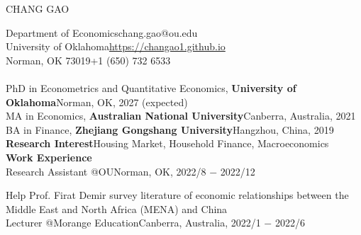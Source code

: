 \documentclass[10pt,letterpaper]{article}
\begin{document}
	\begin{center}
		{\Large CHANG GAO}
	\end{center}
	\noindent Department of Economics\hfill chang.gao@ou.edu\medskip\\
	University of Oklahoma\hfill\href{https://changao1.github.io}{https://changao1.github.io}\medskip\\
Norman, OK   73019\hfill+1 (650) 732 6533\bigskip\\
	\medskip\\
	PhD in Econometrics and Quantitative Economics, {\bf University of Oklahoma}\hfill Norman, OK, 2027 (expected)\medskip\\
    MA in Economics, {\bf Australian National University}\hfill Canberra, Australia, 2021\medskip\\
	BA in Finance, {\bf Zhejiang Gongshang University}\hfill Hangzhou, China, 2019\bigskip\\
	{\bf Research Interest}\hfill Housing Market, Household Finance, Macroeconomics\bigskip\\
	{\bf Work Experience}\medskip\\
		Research Assistant @OU\hfill Norman, OK, 2022/8 $-$ 2022/12\smallskip
		
		Help Prof. Firat Demir survey literature of economic relationships between the Middle East and North Africa (MENA) and China\smallskip\\
		Lecturer @Morange Education\hfill Canberra, Australia, 2022/1 $-$ 2022/6\smallskip
		
\end{document}

